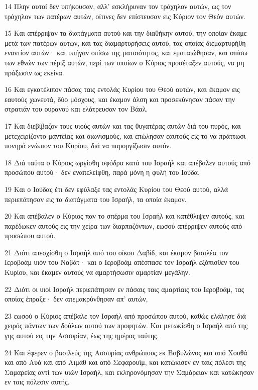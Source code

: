 \par 14 Πλην αυτοί δεν υπήκουσαν, αλλ' εσκλήρυναν τον τράχηλον αυτών, ως τον τράχηλον των πατέρων αυτών, οίτινες δεν επίστευσαν εις Κύριον τον Θεόν αυτών.
\par 15 Και απέρριψαν τα διατάγματα αυτού και την διαθήκην αυτού, την οποίαν έκαμε μετά των πατέρων αυτών, και τας διαμαρτυρήσεις αυτού, τας οποίας διεμαρτυρήθη εναντίον αυτών· και υπήγαν οπίσω της ματαιότητος, και εματαιώθησαν, και οπίσω των εθνών των πέριξ αυτών, περί των οποίων ο Κύριος προσέταξεν αυτούς, να μη πράξωσιν ως εκείνα.
\par 16 Και εγκατέλιπον πάσας ταις εντολάς Κυρίου του Θεού αυτών, και έκαμον εις εαυτούς χωνευτά, δύο μόσχους, και έκαμον άλση και προσεκύνησαν πάσαν την στρατιάν του ουρανού και ελάτρευσαν τον Βάαλ.
\par 17 Και διεβίβαζον τους υιούς αυτών και τας θυγατέρας αυτών διά του πυρός, και μετεχειρίζοντο μαντείας και οιωνισμούς, και επώλησαν εαυτούς εις το να πράττωσι πονηρά ενώπιον του Κυρίου, διά να παροργίζωσιν αυτόν.
\par 18 Διά ταύτα ο Κύριος ωργίσθη σφόδρα κατά του Ισραήλ και απέβαλεν αυτούς από προσώπου αυτού· δεν εναπελείφθη, παρά μόνη η φυλή του Ιούδα.
\par 19 Και ο Ιούδας έτι δεν εφύλαξε τας εντολάς Κυρίου του Θεού αυτού, αλλά περιεπάτησαν εις τα διατάγματα του Ισραήλ, τα οποία έκαμον.
\par 20 Και απέβαλεν ο Κύριος παν το σπέρμα του Ισραήλ και κατέθλιψεν αυτούς, και παρέδωκεν αυτούς εις την χείρα των διαρπαζόντων, εωσού απέρριψεν αυτούς από προσώπου αυτού.
\par 21 Διότι απεσχίσθη ο Ισραήλ από του οίκου Δαβίδ, και έκαμον βασιλέα τον Ιεροβοάμ υιόν του Ναβάτ· και ο Ιεροβοάμ απέσπασε τον Ισραήλ εξόπισθεν του Κυρίου, και έκαμεν αυτούς να αμαρτήσωσιν αμαρτίαν μεγάλην.
\par 22 Διότι οι υιοί Ισραήλ περιεπάτησαν εν πάσαις ταις αμαρτίαις του Ιεροβοάμ, τας οποίας έπραξε· δεν απεμακρύνθησαν απ' αυτών,
\par 23 εωσού ο Κύριος απέβαλε τον Ισραήλ από προσώπου αυτού, καθώς ελάλησε διά χειρός πάντων των δούλων αυτού των προφητών. Και μετωκίσθη ο Ισραήλ από της γης αυτού εις την Ασσυρίαν, έως της ημέρας ταύτης.
\par 24 Και έφερεν ο βασιλεύς της Ασσυρίας ανθρώπους εκ Βαβυλώνος και από Χουθά και από Αυά και από Αιμάθ και από Σεφαρουΐμ, και κατώκισεν εν ταις πόλεσι της Σαμαρείας αντί των υιών Ισραήλ, και εκληρονόμησαν την Σαμάρειαν και κατώκησαν εν ταις πόλεσιν αυτής.

